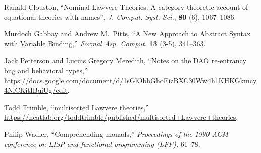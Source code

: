 \documentclass[sigplan,9pt,review,anonymous]{acmart}\settopmatter{printfolios=true,printccs=false,printacmref=false}
\begin{document}
%
\begin{thebibliography}{99}
 Ranald Clouston, ``Nominal Lawvere Theories: A category theoretic account of equational theories with names'', {\em J. Comput. Syst. Sci.}, {\bf 80} (6), 1067--1086.

 Murdoch Gabbay and Andrew M.~Pitts, ``A New Approach to Abstract Syntax with Variable Binding,'' {\em Formal Asp. Comput.} {\bf 13} (3-5), 341--363.

 Jack Petterson and Lucius Gregory Meredith, ``Notes on the DAO re-entrancy bug and behavioral types,'' \href{https://docs.google.com/document/d/1sGlObhGhoEizBXC30Ww4h1KHKGkmcy4NiCKitIBqiUg/edit}{https://docs.google.com/document/d/1sGlObhGhoEizBXC30Ww4h1KHKGkmcy4NiCKitIBqiUg/edit}.

 Todd Trimble, ``multisorted Lawvere theories,'' \href{https://ncatlab.org/toddtrimble/published/multisorted+Lawvere+theories}{https://ncatlab.org/toddtrimble/published/multisorted+Lawvere+theories}.

 Philip Wadler, ``Comprehending monads,'' {\em Proceedings of the 1990 ACM conference on LISP and functional programming (LFP),} 61--78.

\end{thebibliography}


\end{document}
